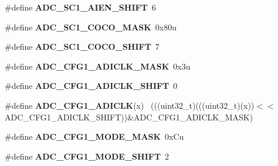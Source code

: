 \begin{DoxyCompactItemize}
\item 
\hypertarget{group___a_d_c___register___masks_gaf2cde8fb207dd348e6313d6d0a5b3761}{}\#define {\bfseries A\+D\+C\+\_\+\+S\+C1\+\_\+\+A\+I\+E\+N\+\_\+\+S\+H\+I\+F\+T}~6\label{group___a_d_c___register___masks_gaf2cde8fb207dd348e6313d6d0a5b3761}

\item 
\hypertarget{group___a_d_c___register___masks_ga698a3a178a5b412febc8c0cc849e8896}{}\#define {\bfseries A\+D\+C\+\_\+\+S\+C1\+\_\+\+C\+O\+C\+O\+\_\+\+M\+A\+S\+K}~0x80u\label{group___a_d_c___register___masks_ga698a3a178a5b412febc8c0cc849e8896}

\item 
\hypertarget{group___a_d_c___register___masks_gad708b138ec734a371a20a990f0c9a27f}{}\#define {\bfseries A\+D\+C\+\_\+\+S\+C1\+\_\+\+C\+O\+C\+O\+\_\+\+S\+H\+I\+F\+T}~7\label{group___a_d_c___register___masks_gad708b138ec734a371a20a990f0c9a27f}

\item 
\hypertarget{group___a_d_c___register___masks_ga849c3ef9995df85776d7d739475cfdd0}{}\#define {\bfseries A\+D\+C\+\_\+\+C\+F\+G1\+\_\+\+A\+D\+I\+C\+L\+K\+\_\+\+M\+A\+S\+K}~0x3u\label{group___a_d_c___register___masks_ga849c3ef9995df85776d7d739475cfdd0}

\item 
\hypertarget{group___a_d_c___register___masks_ga889634c9b4122a2d39f3a986688a1662}{}\#define {\bfseries A\+D\+C\+\_\+\+C\+F\+G1\+\_\+\+A\+D\+I\+C\+L\+K\+\_\+\+S\+H\+I\+F\+T}~0\label{group___a_d_c___register___masks_ga889634c9b4122a2d39f3a986688a1662}

\item 
\hypertarget{group___a_d_c___register___masks_gaac48d0b77fd1d5056c29cee81565798c}{}\#define {\bfseries A\+D\+C\+\_\+\+C\+F\+G1\+\_\+\+A\+D\+I\+C\+L\+K}(x)                                          ~(((uint32\+\_\+t)(((uint32\+\_\+t)(x))$<$$<$A\+D\+C\+\_\+\+C\+F\+G1\+\_\+\+A\+D\+I\+C\+L\+K\+\_\+\+S\+H\+I\+F\+T))\&A\+D\+C\+\_\+\+C\+F\+G1\+\_\+\+A\+D\+I\+C\+L\+K\+\_\+\+M\+A\+S\+K)\label{group___a_d_c___register___masks_gaac48d0b77fd1d5056c29cee81565798c}

\item 
\hypertarget{group___a_d_c___register___masks_gad484c90743265c228af52bf695aaec83}{}\#define {\bfseries A\+D\+C\+\_\+\+C\+F\+G1\+\_\+\+M\+O\+D\+E\+\_\+\+M\+A\+S\+K}~0x\+Cu\label{group___a_d_c___register___masks_gad484c90743265c228af52bf695aaec83}

\item 
\hypertarget{group___a_d_c___register___masks_ga0dc0ce86ab632e5fa2344da9f8617f64}{}\#define {\bfseries A\+D\+C\+\_\+\+C\+F\+G1\+\_\+\+M\+O\+D\+E\+\_\+\+S\+H\+I\+F\+T}~2\label{group___a_d_c___register___masks_ga0dc0ce86ab632e5fa2344da9f8617f64}


\end{DoxyCompactItemize}
